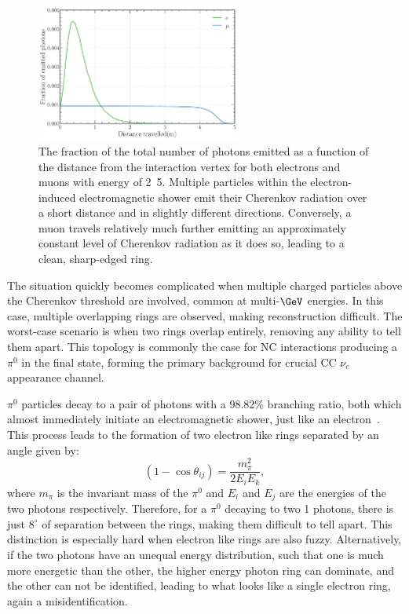 \begin{figure} %
    \includegraphics[width=0.6\textwidth]{diagrams/4-chips/emission_distance.pdf}
    \caption[Fraction of Cherenkov photons emitted as a function of distance]
    {The fraction of the total number of photons emitted as a function of the distance from the
        interaction vertex for both electrons and muons with energy of \unit{2.5}{\GeV}. Multiple
        particles within the electron-induced electromagnetic shower emit their Cherenkov
        radiation over a short distance and in slightly different directions. Conversely, a muon
        travels relatively much further emitting an approximately constant level of Cherenkov
        radiation as it does so, leading to a clean, sharp-edged ring.}
    \label{fig:emission distance}
\end{figure}

The situation quickly becomes complicated when multiple charged particles above the Cherenkov
threshold are involved, common at multi-$\GeV$ energies. In this case, multiple overlapping rings
are observed, making reconstruction difficult. The worst-case scenario is when two rings overlap
entirely, removing any ability to tell them apart. This topology is commonly the case for NC
interactions producing a $\pi^{0}$ in the final state, forming the primary background for crucial
CC $\nu_{e}$ appearance channel.

$\pi^{0}$ particles decay to a pair of photons with a 98.82\% branching ratio, both which almost
immediately initiate an electromagnetic shower, just like an electron~\cite{particle2020}. This
process leads to the formation of two electron like rings separated by an angle given by:
\begin{equation}
    (1-\cos\theta_{ij})=\frac{m_{\pi}^2}{2E_{i}E_{k}},
\end{equation}
where $m_{\pi}$ is the invariant mass of the $\pi^{0}$ and $E_{i}$ and $E_{j}$ are the energies of
the two photons respectively. Therefore, for a $\pi^{0}$ decaying to two \unit{1}{\GeV} photons,
there is just $8^{\circ}$ of separation between the rings, making them difficult to tell apart.
This distinction is especially hard when electron like rings are also fuzzy. Alternatively, if the
two photons have an unequal energy distribution, such that one is much more energetic than the
other, the higher energy photon ring can dominate, and the other can not be identified, leading to
what looks like a single electron ring, again a misidentification.

